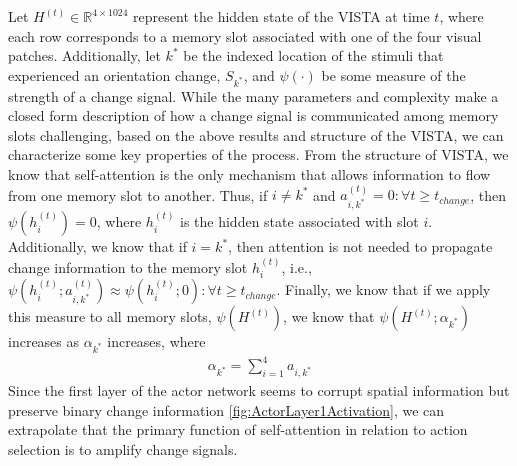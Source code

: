 \documentclass[12pt]{article}
\begin{document}
Let $H^{(t)} \in \mathbb{R}^{4 \times 1024}$ represent the hidden state of the VISTA at time $t$, where each row corresponds to a memory slot associated with one of the four visual patches. Additionally, let $k^*$ be the indexed location of the stimuli that experienced an orientation change, $S_{k^*}$, and $\psi(\cdot)$ be some measure of the strength of a change signal. While the many parameters and complexity make a closed form description of how a change signal is communicated among memory slots challenging, based on the above results and structure of the VISTA, we can characterize some key properties of the process. From the structure of VISTA, we know that self-attention is the only mechanism that allows information to flow from one memory slot to another. Thus, if  $i \neq k^*$ and $a_{i,k^*}^{(t)} = 0: \forall t \geq t_{change}$, then $\psi(h_i^{(t)}) = 0$, where $h_i^{(t)}$ is the hidden state associated with slot $i$. Additionally, we know that if $i = k^*$, then attention is not needed to propagate change information to the memory slot $h_i^{(t)}$, i.e., $\psi(h_i^{(t)};a_{i,k^*}^{(t)}) \approx \psi(h_i^{(t)}; 0): \forall t \geq t_{change}$. Finally, we know that if we apply this measure to all memory slots, $\psi(H^{(t)})$, we know that $\psi(H^{(t)}; \alpha_{k^*})$ increases as $\alpha_{k^*}$ increases, where 
\begin{align*}
    \alpha_{k^*} = \sum_{i=1}^4 a_{i,k^*}
\end{align*}
Since the first layer of the actor network seems to corrupt spatial information but preserve binary change information \autoref{fig:ActorLayer1Activation}, we can extrapolate that the primary function of self-attention in relation to action selection is to amplify change signals.  
\end{document}
